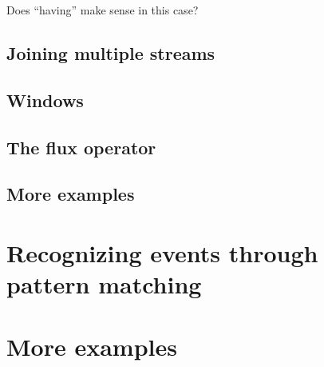 \documentclass[twoside]{report}
\begin{document}
Does ``having'' make sense in this case?

\section{Joining multiple streams}
\section{Windows}
\section{The flux operator}
\section{More examples}

\chapter{Recognizing events through pattern matching}
\chapter{More examples}
\end{document}

